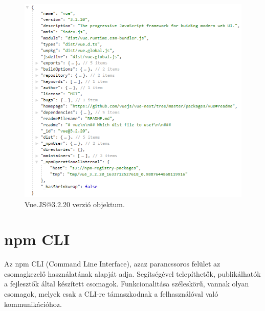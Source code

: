 \begin{flushright}
	\cite{npm-registry-item}
\end{flushright}

\begin{figure}[h]
	\centering
	\includegraphics[scale=0.5]{images/registry_vue_version.png}
	\caption{Vue.JS@3.2.20 verzió objektum.}
	\label{fig:registry-vue-version}
\end{figure}

\pagebreak

\section{npm CLI}

Az npm CLI (Command Line Interface), azaz parancssoros felület az csomagkezelő használatának alapját adja. Segítségével telepíthetők, publikálhatók a fejlesztők által készített csomagok. Funkcionalitása széleskörű, vannak olyan csomagok, melyek csak a CLI-re támaszkodnak a felhasználóval való kommunikációhoz.

